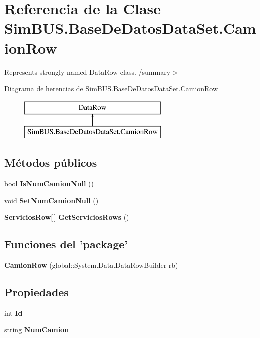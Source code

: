 \section{Referencia de la Clase Sim\-B\-U\-S.\-Base\-De\-Datos\-Data\-Set.\-Camion\-Row}
\label{class_sim_b_u_s_1_1_base_de_datos_data_set_1_1_camion_row}


Represents strongly named Data\-Row class. /summary$>$  


Diagrama de herencias de Sim\-B\-U\-S.\-Base\-De\-Datos\-Data\-Set.\-Camion\-Row\begin{figure}[H]
\begin{center}
\leavevmode
\includegraphics[height=2.000000cm]{class_sim_b_u_s_1_1_base_de_datos_data_set_1_1_camion_row}
\end{center}
\end{figure}
\subsection*{Métodos públicos}
\begin{DoxyCompactItemize}
\item 
bool {\bf Is\-Num\-Camion\-Null} ()
\item 
void {\bf Set\-Num\-Camion\-Null} ()
\item 
{\bf Servicios\-Row}[$\,$] {\bf Get\-Servicios\-Rows} ()
\end{DoxyCompactItemize}
\subsection*{Funciones del 'package'}
\begin{DoxyCompactItemize}
\item 
{\bf Camion\-Row} (global\-::\-System.\-Data.\-Data\-Row\-Builder rb)
\end{DoxyCompactItemize}
\subsection*{Propiedades}
\begin{DoxyCompactItemize}
\item 
int {\bf Id}\hspace{0.3cm}{\ttfamily  [get, set]}
\item 
string {\bf Num\-Camion}\hspace{0.3cm}{\ttfamily  [get, set]}
\end{DoxyCompactItemize}

